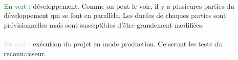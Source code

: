\paragraph{}
\textcolor{green}{En vert : } développement. Comme on peut le voir, il y a plusieures parties du développement qui se font en parallèle. Les durées de chaques parties sont prévisionnelles mais sont susceptibles d’être grandement modifiées.

\paragraph{}
\textcolor{pink}{En rose : } exécution du projet en mode production. Ce seront les tests du reconnaisseur.
